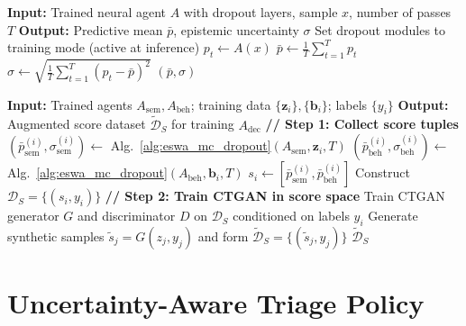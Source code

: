 \begin{algorithm}[ht]
\caption{MC Dropout Uncertainty Estimation for a Neural Agent}
\label{alg:eswa_mc_dropout}
\begin{algorithmic}[1]
    \State \textbf{Input:} Trained neural agent $A$ with dropout layers, sample $x$, number of passes $T$
    \State \textbf{Output:} Predictive mean $\bar{p}$, epistemic uncertainty $\sigma$
    \State Set dropout modules to training mode (active at inference)
        \State $p_t \gets A(x)$ 
    \EndFor
    \State $\bar{p} \gets \frac{1}{T}\sum_{t=1}^{T} p_t$
    \State $\sigma \gets \sqrt{\frac{1}{T}\sum_{t=1}^{T} (p_t - \bar{p})^2}$
    \State \Return $(\bar{p}, \sigma)$
\end{algorithmic}
\end{algorithm}

\begin{algorithm}[ht]
\caption{Score-Level CTGAN Augmentation for Decision Agent Training}
\label{alg:eswa_ctgan}
\begin{algorithmic}[1]
    \State \textbf{Input:} Trained agents $A_{\text{sem}}, A_{\text{beh}}$; training data $\{\mathbf{z}_i\}, \{\mathbf{b}_i\}$; labels $\{y_i\}$
    \State \textbf{Output:} Augmented score dataset $\tilde{\mathcal{D}}_S$ for training $A_{\text{dec}}$
    \Statex \textbf{// Step 1: Collect score tuples}
        \State $(\bar{p}_{\text{sem}}^{(i)}, \sigma_{\text{sem}}^{(i)}) \gets$ Alg.~\ref{alg:eswa_mc_dropout}$(A_{\text{sem}}, \mathbf{z}_i, T)$
        \State $(\bar{p}_{\text{beh}}^{(i)}, \sigma_{\text{beh}}^{(i)}) \gets$ Alg.~\ref{alg:eswa_mc_dropout}$(A_{\text{beh}}, \mathbf{b}_i, T)$
        \State $s_i \gets [\bar{p}_{\text{sem}}^{(i)}, \bar{p}_{\text{beh}}^{(i)}]$
    \EndFor
    \State Construct $\mathcal{D}_S = \{(s_i, y_i)\}$
    \Statex \textbf{// Step 2: Train CTGAN in score space}
    \State Train CTGAN generator $G$ and discriminator $D$ on $\mathcal{D}_S$ conditioned on labels $y_i$
    \State Generate synthetic samples $\tilde{s}_j = G(z_j, y_j)$ and form $\tilde{\mathcal{D}}_S = \{(\tilde{s}_j, y_j)\}$
    \State \Return $\tilde{\mathcal{D}}_S$
\end{algorithmic}
\end{algorithm}


\section{Uncertainty-Aware Triage Policy}
\label{sec:eswa_policy}


